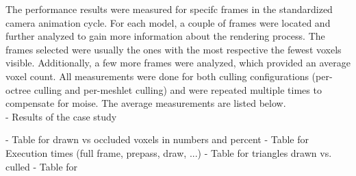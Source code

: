 The performance results were measured for specifc frames in the standardized camera animation cycle. For each 
model, a couple of frames were located and further analyzed to gain more information about the rendering 
process. The frames selected were usually the ones with the most respective the fewest voxels visible. Additionally,
a few more frames were analyzed, which provided an average voxel count. All measurements were done for both 
culling configurations (per-octree culling and per-meshlet culling) and were repeated multiple times to compensate 
for moise. The average measurements are listed below. \\










- Results of the case study

- Table for drawn vs occluded voxels in numbers and percent
- Table for Execution times (full frame, prepass, draw, ...)
- Table for triangles drawn vs. culled 
- Table for 
